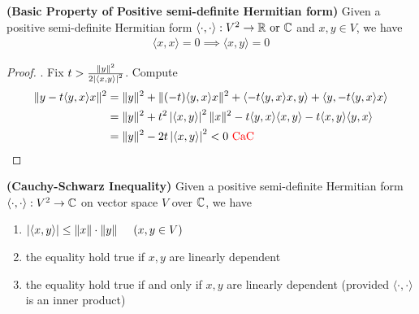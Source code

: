 \documentclass{report}
\begin{document}
\begin{theorem}
\label{BPoP}
\textbf{(Basic Property of Positive semi-definite Hermitian form)} Given a positive semi-definite Hermitian form $\langle \cdot,\cdot\rangle:V^2 \rightarrow \mathbb{R}\text{ or }\mathbb{C} $ and $x,y \in V$, we have 
\begin{align*}
\langle x,x\rangle =0 \implies \langle x,y\rangle =0
\end{align*}
\end{theorem}
\begin{proof}
. Fix $t> \frac{\| y \|^2 }{2\left|\langle x,y\rangle \right|^2}$. Compute 
\begin{align*}
\| y-t\langle y,x\rangle x \|^2 &= \| y \|^2 + \| (-t)\langle y,x\rangle x  \|^2  + \langle -t\langle y,x\rangle x,y \rangle + \langle y,-t\langle y,x\rangle x\rangle \\
&=\| y \|^2 + t^2 \left|\langle x,y\rangle \right|^2 \| x \|^2 -t \langle y,x\rangle \langle x,y\rangle - t \langle x,y\rangle \langle y,x\rangle  \\
&= \| y \|^2- 2t \left|\langle x,y\rangle \right|^2 <0 \text{ \textcolor{red}{CaC} }
\end{align*}
\end{proof}
\begin{theorem}
\textbf{(Cauchy-Schwarz Inequality)} Given a positive semi-definite Hermitian form $\langle \cdot,\cdot\rangle :V^2\rightarrow \mathbb{C}$ on vector space $V$ over $\mathbb{C}$, we have 
\begin{enumerate}[label=(\alph*)]
  \item $\left|\langle x,y\rangle\right|\leq  \| x \|\cdot\| y \|\hspace{0.5cm}(x,y \in V)$ 
  \item the equality hold true if $x,y$ are linearly dependent
  \item the equality hold true if and only if $x,y$ are linearly dependent (provided $\langle \cdot,\cdot\rangle $ is an inner product)
\end{enumerate}
\end{theorem}
\end{document}
